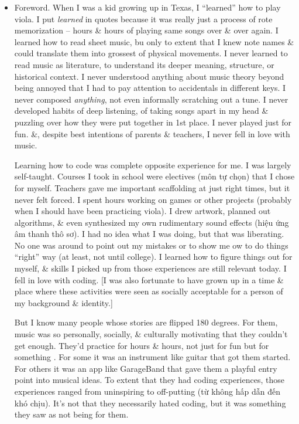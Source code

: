 \documentclass{article}
\begin{document}
\begin{itemize}
	{\sc Melanie West} is a PhD student in Learning Sciences at Northwestern University \& co-founder of Tiz Media Foundation, a nonprofit dedicated to empowering underrepresented youth through science, technology, engineering, \& mathematics (STEM) programs.
	
	{\sc Cameron Roberts} is a software developer \& musician living in Chicago. He holds degrees from Northwestern University in Music Performance \& CS.
	\item {\sf Foreword.} When I was a kid growing up in Texas, I ``learned'' how to play viola. I put {\it learned} in quotes because it was really just a process of rote memorization -- hours \& hours of playing same songs over \& over again. I learned how to read sheet music, bu only to extent that I knew note names \& could translate them into grossest of physical movements. I never learned to read music as literature, to understand its deeper meaning, structure, or historical context. I never understood anything about music theory beyond being annoyed that I had to pay attention to accidentals in different keys. I never composed {\it anything}, not even informally scratching out a tune. I never developed habits of deep listening, of taking songs apart in my head \& puzzling over how they were put together in 1st place. I never played just for fun. \&, despite best intentions of parents \& teachers, I never fell in love with music.
	
	Learning how to code was complete opposite experience for me. I was largely self-taught. Courses I took in school were electives (môn tự chọn) that I chose for myself. Teachers gave me important scaffolding at just right times, but it never felt forced. I spent hours working on games or other projects (probably when I should have been practicing viola). I drew artwork, planned out algorithms, \& even synthesized my own rudimentary sound effects (hiệu ứng âm thanh thô sơ). I had no idea what I was doing, but that was liberating. No one was around to point out my mistakes or to show me ow to do things ``right'' way (at least, not until college). I learned how to figure things out for myself, \& skills I picked up from those experiences are still relevant today. I fell in love with coding. [I was also fortunate to have grown up in a time \& place where these activities were seen as socially acceptable for a person of my background \& identity.]
	
	But I know many people whose stories are flipped 180 degrees. For them, music was so personally, socially, \& culturally motivating that they couldn't get enough. They'd practice for hours \& hours, not just for fun but for something . For some it was an instrument like guitar that got them started. For others it was an app like GarageBand that gave them a playful entry point into musical ideas. To extent that they had coding experiences, those experiences ranged from uninspiring to off-putting (từ không hấp dẫn đến khó chịu). It's not that they necessarily hated coding, but it was something they saw as not being for them.
	

\end{itemize}
\end{document}
